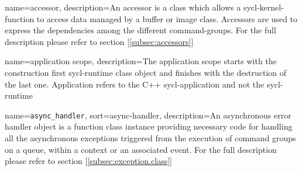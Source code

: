 %





\makenoidxglossaries
\glstoctrue
{}
{
  name=accessor,
  description={An accessor is a class which allows a
               \gls{sycl-kernel-function} to access data managed by a \gls{buffer} or
               \gls{image} class. Accessors are used to express the dependencies
               among the different \glspl{command-group}. For the full
               description please refer to section [\ref{subsec:accessors}]}
}

{
  name={application scope},
  description={The application scope starts with the
               construction first \gls{sycl-runtime} class object and
               finishes with the destruction of the last one.
               Application refers to the C++ \gls{sycl-application} and not
               the \gls{sycl-runtime}}
}

{
  name={\texttt{async\string_handler}},
  sort=async-handler,
  description={An asynchronous error handler object is a function class instance
               providing necessary code for handling all the asynchronous
               exceptions triggered from the execution of command groups on a
               queue, within a context or an associated event. For the full
               description please refer to section [\ref{subsec:exception.class}]}
}

